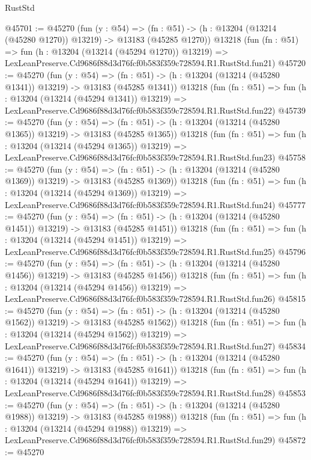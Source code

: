 \begin{lexlean}{RustStd}
\begin{coremodule}
@45701 := @45270
    (fun (y : @54) =>
    (fn : @51) -> (h : @13204 (@13214 (@45280 @1270)) @13219) -> @13183 (@45285 @1270))
    @13218
    (fun (fn : @51) =>
    fun (h : @13204 (@13214 (@45294 @1270)) @13219) =>
    LexLeanPreserve.Cd9686f88d3d76fcf0b583f359c728594.R1.RustStd.fun21)
@45720 := @45270
    (fun (y : @54) =>
    (fn : @51) -> (h : @13204 (@13214 (@45280 @1341)) @13219) -> @13183 (@45285 @1341))
    @13218
    (fun (fn : @51) =>
    fun (h : @13204 (@13214 (@45294 @1341)) @13219) =>
    LexLeanPreserve.Cd9686f88d3d76fcf0b583f359c728594.R1.RustStd.fun22)
@45739 := @45270
    (fun (y : @54) =>
    (fn : @51) -> (h : @13204 (@13214 (@45280 @1365)) @13219) -> @13183 (@45285 @1365))
    @13218
    (fun (fn : @51) =>
    fun (h : @13204 (@13214 (@45294 @1365)) @13219) =>
    LexLeanPreserve.Cd9686f88d3d76fcf0b583f359c728594.R1.RustStd.fun23)
@45758 := @45270
    (fun (y : @54) =>
    (fn : @51) -> (h : @13204 (@13214 (@45280 @1369)) @13219) -> @13183 (@45285 @1369))
    @13218
    (fun (fn : @51) =>
    fun (h : @13204 (@13214 (@45294 @1369)) @13219) =>
    LexLeanPreserve.Cd9686f88d3d76fcf0b583f359c728594.R1.RustStd.fun24)
@45777 := @45270
    (fun (y : @54) =>
    (fn : @51) -> (h : @13204 (@13214 (@45280 @1451)) @13219) -> @13183 (@45285 @1451))
    @13218
    (fun (fn : @51) =>
    fun (h : @13204 (@13214 (@45294 @1451)) @13219) =>
    LexLeanPreserve.Cd9686f88d3d76fcf0b583f359c728594.R1.RustStd.fun25)
@45796 := @45270
    (fun (y : @54) =>
    (fn : @51) -> (h : @13204 (@13214 (@45280 @1456)) @13219) -> @13183 (@45285 @1456))
    @13218
    (fun (fn : @51) =>
    fun (h : @13204 (@13214 (@45294 @1456)) @13219) =>
    LexLeanPreserve.Cd9686f88d3d76fcf0b583f359c728594.R1.RustStd.fun26)
@45815 := @45270
    (fun (y : @54) =>
    (fn : @51) -> (h : @13204 (@13214 (@45280 @1562)) @13219) -> @13183 (@45285 @1562))
    @13218
    (fun (fn : @51) =>
    fun (h : @13204 (@13214 (@45294 @1562)) @13219) =>
    LexLeanPreserve.Cd9686f88d3d76fcf0b583f359c728594.R1.RustStd.fun27)
@45834 := @45270
    (fun (y : @54) =>
    (fn : @51) -> (h : @13204 (@13214 (@45280 @1641)) @13219) -> @13183 (@45285 @1641))
    @13218
    (fun (fn : @51) =>
    fun (h : @13204 (@13214 (@45294 @1641)) @13219) =>
    LexLeanPreserve.Cd9686f88d3d76fcf0b583f359c728594.R1.RustStd.fun28)
@45853 := @45270
    (fun (y : @54) =>
    (fn : @51) -> (h : @13204 (@13214 (@45280 @1988)) @13219) -> @13183 (@45285 @1988))
    @13218
    (fun (fn : @51) =>
    fun (h : @13204 (@13214 (@45294 @1988)) @13219) =>
    LexLeanPreserve.Cd9686f88d3d76fcf0b583f359c728594.R1.RustStd.fun29)
@45872 := @45270

\end{coremodule}
\end{lexlean}
